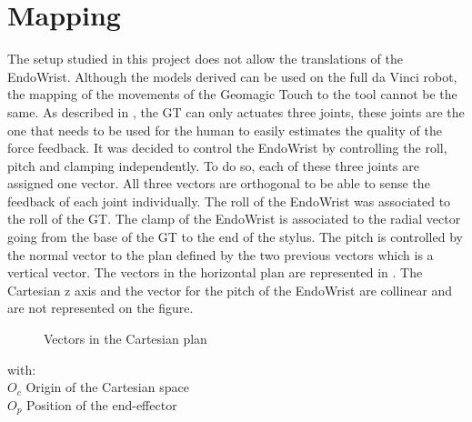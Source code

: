 \section{Mapping}

The setup studied in this project does not allow the translations of the EndoWrist. Although the models derived can be used on the full da Vinci robot, the mapping of the movements of the Geomagic Touch to the tool cannot be the same. As described in , the GT can only actuates three joints, these joints are the one that needs to be used for the human to easily estimates the quality of the force feedback. It was decided to control the EndoWrist by controlling the roll, pitch and clamping independently. To do so, each of these three joints are assigned one vector. All three vectors are orthogonal to be able to sense the feedback of each joint individually.
The roll of the EndoWrist was associated to the roll of the GT. The clamp of the EndoWrist is associated to the radial vector going from the base of the GT to the end of the stylus. The pitch is controlled by the normal vector to the plan defined by the two previous vectors which is a vertical vector. The vectors in the horizontal plan are represented in . The Cartesian z axis and the vector for the pitch of the EndoWrist are collinear and are not represented on the figure.
\\

\begin{figure}[H]
\centering
{}
\label{fig:cartesian_polar}
\caption{Vectors in the Cartesian plan}
\end{figure}
with:\\
	\hspace*{8mm} $O_c$ Origin of the Cartesian space\\
	\hspace*{8mm} $O_p$ Position of the end-effector


